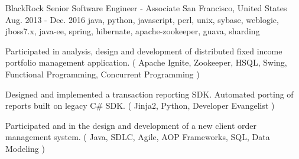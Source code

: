 \cventry
    {BlackRock} %
    {Senior Software Engineer - Associate} %
    {San Francisco, United States} %
    {Aug. 2013 - Dec. 2016} %
    {java, python, javascript, perl, unix, sybase, weblogic, jboss7.x, java-ee, spring, hibernate, apache-zookeeper, guava, sharding}%
    {
    \begin{cvitems} %
        \item { Participated in analysis, design and development of distributed fixed income portfolio management application. ( Apache Ignite, Zookeeper, HSQL, Swing, Functional Programming, Concurrent Programming )}
        \item { Designed and implemented a transaction reporting SDK. Automated porting of reports built on legacy C\# SDK. ( Jinja2, Python, Developer Evangelist )}
        \item { Participated and in the design and development of a new client order management system. ( Java, SDLC, Agile, AOP Frameworks, SQL, Data Modeling )}
    \end{cvitems}
    }